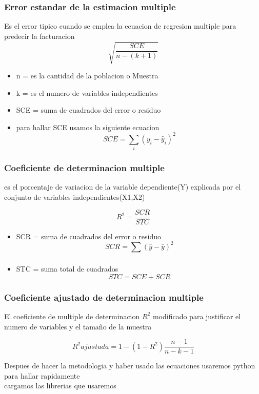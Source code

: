 \documentclass{article}
\begin{document}
\subsubsection {Error estandar de la estimacion multiple}
Es el error tipico cuando se emplea la ecuacion de regresion multiple para predecir la facturacion
\[
\sqrt{\frac{SCE}{{n-(k+1)}}}
\]
\begin{itemize}
  \item n = es la cantidad de la poblacion o Muestra
  \item k = es el numero de variables independientes
  \item SCE = suma de cuadrados del error o residuo
  \item para hallar SCE usamos la siguiente ecuacion
  \[
    SCE = \sum_{i}(y_i - \hat{y}_i)^2  
  \]
\end{itemize}
\subsubsection{Coeficiente de determinacion multiple }
es el porcentaje de variacion de la variable dependiente(Y) explicada por el conjunto de variables independientes(X1,X2)

\[
  R^2 = \frac{SCR}{STC}
\]
\begin{itemize}
  \item SCR = suma de cuadrados del error o residuo
  \[
    SCR = \sum_{}(\hat{y} -\bar{y} )^2  
  \] 
  \item STC = suma total de cuadrados
  \[
    STC = SCE + SCR  
  \] 
\end{itemize}
\subsubsection{Coeficiente ajustado de determinacion multiple}
El coeficiente de multiple de determinacion $R^2$ modificado para justificar el numero de variables y el tama\~no de la muestra

\[
R^2 ajustada =  1- {(1- R^2)}{\frac{n-1}{n-k-1}}
\]

Despues de hacer la metodologia y haber usado las ecuaciones usaremos python para hallar rapidamente
\\

cargamos las librerias que usaremos
\end{document}
